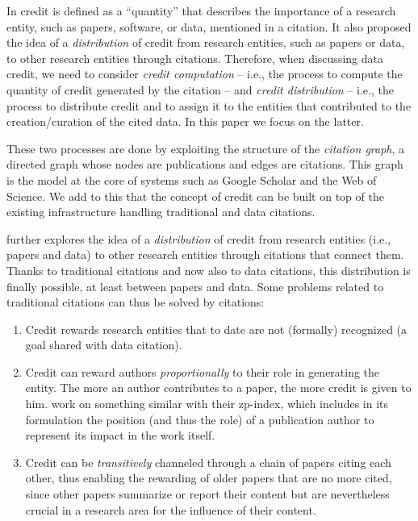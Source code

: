 \documentclass[preprint,12pt,sort&compress]{elsarticle}
\begin{document}
In \citep{transitiveCreditKatz2014} credit is defined as a ``quantity'' that describes the importance of a research entity, such as papers, software, or data, mentioned in a citation. 
It also proposed the idea of a \emph{distribution} of credit from research entities, such as papers or data, to other research entities through citations. 
Therefore, when discussing data credit, we need to consider  \emph{credit computation} -- i.e., the process to compute the quantity of credit generated by the citation -- and \emph{credit distribution} -- i.e., the process to distribute credit and to assign it to the entities that contributed to the creation/curation of the cited data. In this paper we focus on the latter.

These two processes are done by exploiting the structure of the \emph{citation graph}, a directed graph whose nodes are publications and edges are citations.
This graph is the model at the core of systems such as Google Scholar and the Web of Science.
We add to this that the concept of credit can be built on top of the existing infrastructure handling traditional and data citations.

\citet{transitiveCreditKatz2014} further explores the idea of a \emph{distribution} of credit from research entities (i.e., papers and data) to other research entities through citations that connect them. 
Thanks to traditional citations and now also to data citations, this distribution is finally possible, at least between papers and data. 
Some problems related to traditional citations can thus be solved by citations:

\begin{enumerate}
\item Credit rewards research entities that to date are not (formally) recognized (a goal shared with data citation).
\item Credit can reward authors \emph{proportionally} to their role in generating the entity. The more an author contributes to a paper, the more credit is given to him. \citet{ZouP16} work on something similar with their zp-index, which includes in its formulation the position (and thus the role) of a publication author to represent its impact in the work itself.
\item Credit can be \emph{transitively} channeled through a chain of papers citing each other, thus enabling the rewarding of older papers that are no more cited, since other papers summarize or report their content 
but are nevertheless crucial in a research area for the influence of their content.
\end{enumerate}
\end{document}
